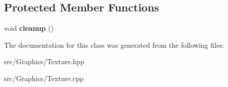 \subsection*{Protected Member Functions}
\begin{DoxyCompactItemize}
\item 
\hypertarget{class_texture_ae13a97cde8768d3b61fd9524c21fbfac}{void {\bfseries cleanup} ()}\label{class_texture_ae13a97cde8768d3b61fd9524c21fbfac}

\end{DoxyCompactItemize}


The documentation for this class was generated from the following files\+:\begin{DoxyCompactItemize}
\item 
src/\+Graphics/Texture.\+hpp\item 
src/\+Graphics/Texture.\+cpp\end{DoxyCompactItemize}
